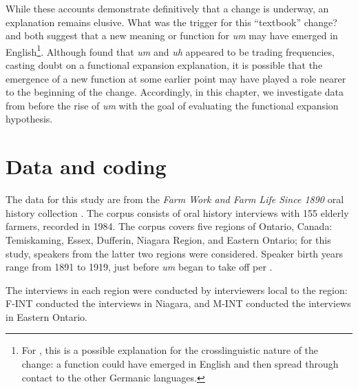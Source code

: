 \documentclass[11pt]{article}
\begin{document}
While these accounts demonstrate definitively that a change is underway, an
explanation remains elusive.
What was the trigger for this ``textbook'' change?
\textcite{fruehwald2016} and \textcite{wielingetal2016} both suggest that a new
meaning or function for \emph{um} may have emerged in English\footnote{%
    For \textcite{wielingetal2016}, this is a possible explanation for the
    crosslinguistic nature of the change: a function could have emerged in
    English and then spread through contact to the other Germanic languages.
}.
Although \textcite{fruehwald2016} found that \emph{um} and \emph{uh} appeared to
be trading frequencies, casting doubt on a functional expansion explanation, it
is possible that the emergence of a new function at some earlier point may have
played a role nearer to the beginning of the change.
Accordingly, in this chapter, we investigate data from before the rise of \emph{um} with the goal of evaluating the functional expansion hypothesis.

\section{Data and coding}

The data for this study are from the \emph{Farm Work and Farm Life Since 1890}
oral history collection \parencite{denis2016}.
The corpus consists of oral history interviews with 155 elderly farmers,
recorded in 1984.
The corpus covers five regions of Ontario, Canada: Temiskaming, Essex, Dufferin,
Niagara Region, and Eastern Ontario; for this study, speakers from the latter
two regions were considered.
Speaker birth years range from 1891 to 1919, just before \emph{um} began to take
off per \textcite{fruehwald2016}.

The interviews in each region were conducted by interviewers local to the
region: F-INT conducted the interviews in Niagara, and M-INT conducted the
interviews in Eastern Ontario.
\end{document}
